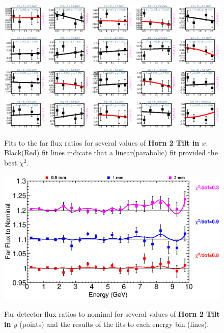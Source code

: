 {\begin{figure}[ht]
  \begin{center}
    {\includegraphics[width=5.0in]{figures/Horn2XTilt_far_fits.eps}}
  \end{center}
\caption{ Fits to the far flux ratios for several values of {\bf Horn 2 Tilt in $x$}. Black(Red) fit lines indicate that a linear(parabolic) fit provided the best $\chi^2$. }
\end{figure}

\begin{figure}[ht]
  \begin{center}
    {\includegraphics[width=6.0in]{figures/Horn2YTilt_far_summary.eps}}
  \end{center}
\caption{ Far detector flux ratios to nominal for several values of {\bf Horn 2 Tilt in $y$} (points) and the results of the fits to each energy bin (lines).}
\end{figure}

}
